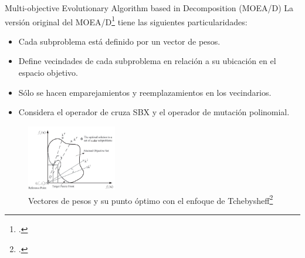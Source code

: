 \documentclass{beamer}
\begin{document}
\begin{frame}{Multi-objective Evolutionary Algorithm based in Decomposition (MOEA/D)}
\scriptsize
La versión original del MOEA/D\footcite{ishibuchi1998multi} tiene las siguientes particularidades:
\begin{itemize}
\scriptsize
    \item Cada subproblema está definido por un vector de pesos.
    \item Define vecindades de cada subproblema en relación a su ubicación en el espacio objetivo.
    \item Sólo se hacen emparejamientos y reemplazamientos en los vecindarios.
    \item Considera el operador de cruza SBX y el operador de mutación polinomial.
\end{itemize}
\begin{figure}[H]
\centering
\includegraphics[width=0.35\textwidth]{Images/moead_diagrama.png}
\caption{\scriptsize Vectores de pesos y su punto óptimo con el enfoque de Tchebysheff\footcite{Joel:MOEAD_Adaptative}}
\end{figure}

\end{frame}
\end{document}
